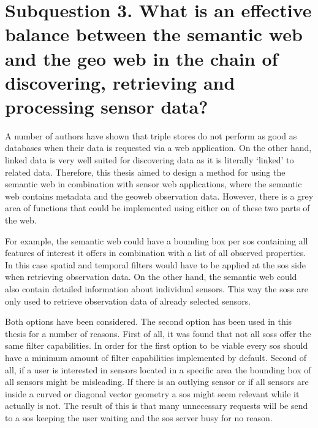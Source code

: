 
\section*{\textbf{Subquestion 3.} What is an effective balance between the semantic web and the geo web in the chain of discovering, retrieving and processing sensor data?}%

A number of authors have shown that triple stores do not perform as good as databases when their data is requested via a web application. On the other hand, linked data is very well suited for discovering data as it is literally `linked' to related data. Therefore, this thesis aimed to design a method for using the semantic web in combination with sensor web applications, where the semantic web contains metadata and the geoweb observation data. However, there is a grey area of functions that could be implemented using either on of these two parts of the web. 

For example, the semantic web could have a bounding box per \ac{sos} containing all features of interest it offers in combination with a list of all observed properties. In this case spatial and temporal filters would have to be applied at the \ac{sos} side when retrieving observation data. On the other hand, the semantic web could also contain detailed information about individual sensors. This way the \aclp{sos} are only used to retrieve observation data of already selected sensors.

Both options have been considered. The second option has been used in this thesis for a number of reasons. First of all, it was found that not all \aclp{sos} offer the same filter capabilities. In order for the first option to be viable every \ac{sos} should have a minimum amount of filter capabilities implemented by default. 
Second of all, if a user is interested in sensors located in a specific area the bounding box of all sensors might be misleading. If there is an outlying sensor or if all sensors are inside a curved or diagonal vector geometry a \ac{sos} might seem relevant while it actually is not. The result of this is that many unnecessary requests will be send to a \ac{sos} keeping the user waiting and the \ac{sos} server busy for no reason. 

